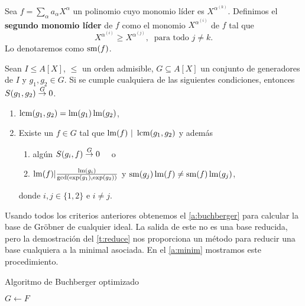 \begin{definicion}
    Sea $f= \sum_{\alpha} a_{\alpha} X^{\alpha}$ un polinomio cuyo monomio líder es $X^{\alpha^{(k)}}$. Definimos el \textbf{segundo monomio líder} de $f$ como el monomio $X^{\alpha^{(i)}}$ de $f$ tal que
    \begin{equation*}
        X^{\alpha^{(i)}} \ge X^{\alpha^{(j)}},\ \text{ para todo } j\neq k. 
    \end{equation*}
    Lo denotaremos como $\operatorname{sm}(f)$.
\end{definicion}
\begin{teorema}\label{t:criterios}
    Sean $I\le A[X]$, $\le$ un orden admisible, $G\subseteq A[X]$ un conjunto de generadores de $I$ y $g_1,g_2 \in G$. Si se cumple cualquiera de las siguientes condiciones, entonces  $S(g_1,g_2)\stackrel{G}{\to} 0$.
    \begin{enumerate}
        \item $\operatorname{lcm}(g_1,g_2) = \operatorname{lm}(g_1)\operatorname{lm}(g_2)$,
        \item Existe un $f\in G$ tal que $\operatorname{lm}(f)\ \vert\ \operatorname{lcm}(g_1,g_2)$ y además
        \begin{enumerate}
            \item algún $S(g_i,f)\stackrel{G}{\to} 0\quad$ o
            \item $\operatorname{lm}(f)\vert \frac{\operatorname{lm}(g_i)}{\mathrm{gcd}(\exp(g_1),\exp(g_2))}$ y $\operatorname{sm}(g_j)\operatorname{lm}(f) \neq \operatorname{sm}(f)\operatorname{lm}(g_j)$,
        \end{enumerate}
        donde $i,j\in\{1,2\}$ e $i\neq j$.
    \end{enumerate}
    
\end{teorema}

Usando todos los criterios anteriores obtenemos el \autoref{a:buchberger} para calcular la base de Gröbner de cualquier ideal. La salida de este no es una base reducida, pero la demostración del \autoref{t:reduce} nos proporciona un método para reducir una base cualquiera a la minimal asociada. En el \autoref{a:minim} mostramos este procedimiento.\newline

\begin{algorithm}[hbt!]
    \caption{Algoritmo de Buchberger optimizado}\label{a:buchberger}

    $G\gets F$\;


\end{algorithm}

